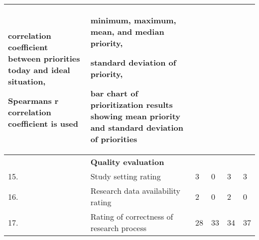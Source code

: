 \begin{table}
{\begin{tabular}{|>{\raggedright}p{}|>{\raggedright}p{}|>{\raggedright}p{}|>{\raggedright}p{}|>{\raggedright}p{}|>{\raggedright}p{}|}
correlation coefficient between priorities today and ideal situation,

Spearmans r correlation coefficient is used
 & 
minimum, maximum, mean, and median priority, 

standard deviation of priority,

bar chart of prioritization results showing mean priority and standard deviation of priorities

\tabularnewline
\hline 
 & \textbf{Quality evaluation} &  &  &  & \tabularnewline
\hline 
15. & Study setting rating & 3 & 0 & 3 & 3\tabularnewline
\hline 
16. & Research data availability rating & 2 & 0 & 2 & 0\tabularnewline
\hline 
17. & Rating of correctness of research process & 28 & 33 & 34 & 37\tabularnewline
\hline
\end{tabular}%
}
\end{table}

